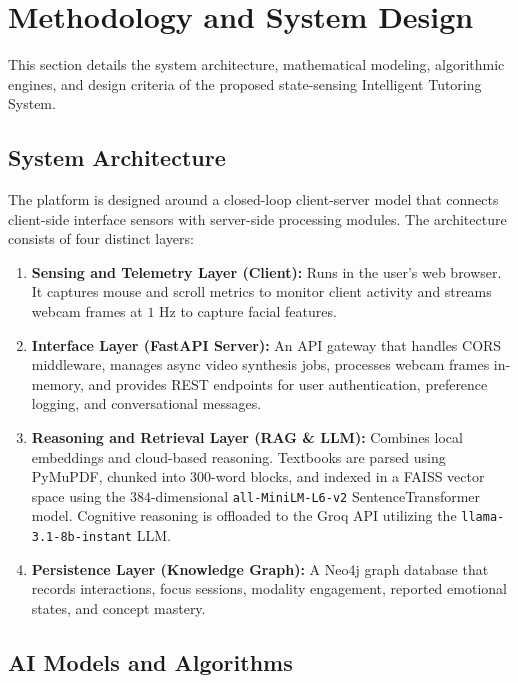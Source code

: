 
\section{Methodology and System Design}
\label{sec:methodology}

This section details the system architecture, mathematical modeling, algorithmic engines, and design criteria of the proposed state-sensing Intelligent Tutoring System.

\subsection{System Architecture}
\label{subsec:system_architecture}

The platform is designed around a closed-loop client-server model that connects client-side interface sensors with server-side processing modules. The architecture consists of four distinct layers:
\begin{enumerate}
    \item \textbf{Sensing and Telemetry Layer (Client):} Runs in the user's web browser. It captures mouse and scroll metrics to monitor client activity and streams webcam frames at $1\text{ Hz}$ to capture facial features.
    \item \textbf{Interface Layer (FastAPI Server):} An API gateway that handles CORS middleware, manages async video synthesis jobs, processes webcam frames in-memory, and provides REST endpoints for user authentication, preference logging, and conversational messages.
    \item \textbf{Reasoning and Retrieval Layer (RAG \& LLM):} Combines local embeddings and cloud-based reasoning. Textbooks are parsed using PyMuPDF, chunked into 300-word blocks, and indexed in a FAISS vector space using the $384$-dimensional \texttt{all-MiniLM-L6-v2} SentenceTransformer model. Cognitive reasoning is offloaded to the Groq API utilizing the \texttt{llama-3.1-8b-instant} LLM.
    \item \textbf{Persistence Layer (Knowledge Graph):} A Neo4j graph database that records interactions, focus sessions, modality engagement, reported emotional states, and concept mastery.
\end{enumerate}

\subsection{AI Models and Algorithms}
\label{subsec:models_algorithms}


